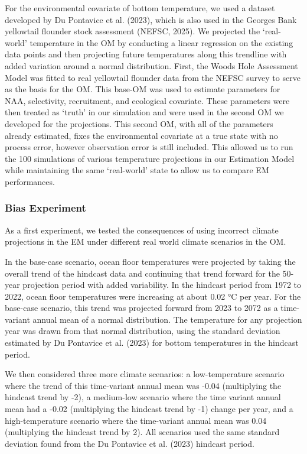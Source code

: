 \documentclass[
  12pt,
]{article}
\begin{document}
For the environmental covariate of bottom temperature, we used a dataset developed by Du Pontavice et al. (2023), which is also used in the Georges Bank yellowtail flounder stock assessment (NEFSC, 2025). We projected the `real-world' temperature in the OM by conducting a linear regression on the existing data points and then projecting future temperatures along this trendline with added variation around a normal distribution. First, the Woods Hole Assessment Model was fitted to real yellowtail flounder data from the NEFSC survey to serve as the basis for the OM. This base-OM was used to estimate parameters for NAA, selectivity, recruitment, and ecological covariate. These parameters were then treated as `truth' in our simulation and were used in the second OM we developed for the projections. This second OM, with all of the parameters already estimated, fixes the environmental covariate at a true state with no process error, however observation error is still included. This allowed us to run the 100 simulations of various temperature projections in our Estimation Model while maintaining the same `real-world' state to allow us to compare EM performances.

\subsubsection{Bias Experiment}\label{bias-experiment}

As a first experiment, we tested the consequences of using incorrect climate projections in the EM under different real world climate scenarios in the OM.

In the base-case scenario, ocean floor temperatures were projected by taking the overall trend of the hindcast data and continuing that trend forward for the 50-year projection period with added variability. In the hindcast period from 1972 to 2022, ocean floor temperatures were increasing at about 0.02 °C per year. For the base-case scenario, this trend was projected forward from 2023 to 2072 as a time-variant annual mean of a normal distribution. The temperature for any projection year was drawn from that normal distribution, using the standard deviation estimated by Du Pontavice et al. (2023) for bottom temperatures in the hindcast period.

We then considered three more climate scenarios: a low-temperature scenario where the trend of this time-variant annual mean was -0.04 (multiplying the hindcast trend by -2), a medium-low scenario where the time variant annual mean had a -0.02 (multiplying the hindcast trend by -1) change per year, and a high-temperature scenario where the time-variant annual mean was 0.04 (multiplying the hindcast trend by 2). All scenarios used the same standard deviation found from the Du Pontavice et al. (2023) hindcast period.
\end{document}
